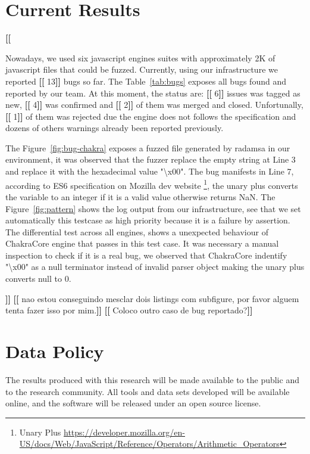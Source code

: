 \documentclass[11pt]{article}
\newcommand{\Fix}[1]{\textbf{[[}{\color{red} #1}\textbf{]]}}
\newcommand{\Igor}[1]{\textbf{[[}{\color{darkaquamarine} #1}\textbf{]]}}
\begin{document}
\section{Current Results}
\label{sec:results}

\Igor{
  Nowadays, we used six javascript engines suites with approximately 2K of javascript files 
  that could be fuzzed. Currently, using our infrastructure we reported \Fix{13}
  bugs so far. The Table~\ref{tab:bugs} exposes all bugs found and reported by our team.
  At this moment, the status are: \Fix{6} issues was tagged as new, \Fix{4} was confirmed
  and \Fix{2} of them was merged and closed. Unfortunally, \Fix{1} of them was rejected
  due the engine does not follows the specification and dozens of others warnings already been
  reported previously.

  The Figure~\ref{fig:bug-chakra} exposes a fuzzed file generated by radamsa in our environment, it was observed
  that the fuzzer replace the empty string at Line 3 and replace it with the hexadecimal value "\textbackslash x00".
  The bug manifests in Line 7, according to ES6 specification on Mozilla dev website
  \footnote{Unary Plus \url{https://developer.mozilla.org/en-US/docs/Web/JavaScript/Reference/Operators/Arithmetic_Operators}},
  the unary plus converts the variable to an integer if it is a valid value
  otherwise returns NaN. The Figure~\ref{fig:pattern} shows the log output from our infrastructure,
  see that we set automatically this testcase as high priority because it is a failure by assertion.
  The differential test across all engines, shows a unexpected behaviour of ChakraCore engine that passes in this test case.
  It was necessary a manual inspection to check if it is a real bug, we observed that 
  ChakraCore indentify "\textbackslash x00" as a null terminator instead of invalid parser object making
  the unary plus converts null to 0.
}
\Fix{nao estou conseguindo mesclar dois listings com subfigure, por favor alguem tenta fazer isso por mim.}
\Igor{Coloco outro caso de bug reportado?}




\section{Data Policy}

The results produced with this research will be made available to the
public and to the research community.  All tools and data sets
developed will be available online, and the software will be released
under an open source license.


\footnotesize


\end{document}
